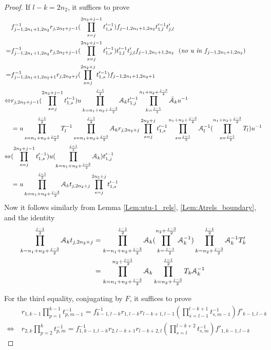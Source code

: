 \documentclass{amsart}
\begin{document}
\begin{proof}
If $l-k=2n_2$, it suffices to prove
\[
\begin{aligned}
&f^{-1}_{j-1,2n_1+1,2n_2}r_{j,2n_2+j-1}(\prod^{2n_2+j-1}_{s=j} t'^{-1}_{1,s})f_{j-1,2n_1+1,2n_2}t'^{-1}_{1,l}
t'_{j,l}\\
=&f^{-1}_{j-1,2n_1+1,2n_2}r_{j,2n_2+j-1}(\prod^{2n_2+j-1}_{s=j} t'^{-1}_{1,s})t'^{-1}_{1,l}
t'_{j,l}f_{j-1,2n_1+1,2n_2}\ \ (\textit{no u in }f_{j-1,2n_1+1,2n_2})\\
=&f^{-1}_{j-1,2n_1+1,2n_2+1}r_{j,2n_2+j}(\prod^{2n_2+j}_{s=j} t'^{-1}_{1,s})f_{j-1,2n_1+1,2n_2+1}\\
\Leftrightarrow & r_{j,2n_2+j-1}(\prod^{2n_2+j-1}_{s=j} t'^{-1}_{1,s})u\prod^{\frac{j-1}{2}}_{k=n_1+n_2+\frac{j-3}{2}}\AA_{k}t'^{-1}_{1,j}\prod^{n_1+n_2+\frac{j-3}{2}}_{k=\frac{j-1}{2}}\bar{\AA}_{k}u^{-1}\\
&=u\prod^{\frac{j-1}{2}}_{s=n_1+n_2+\frac{j-3}{2}}T^{-1}_{l} \prod^{\frac{j-1}{2}}_{s=n_1+n_2+\frac{j-3}{2}}\AA_k r_{j,2n_2+j}\prod^{2n_2+j}_{s=j} t'^{-1}_{1,s}\prod^{n_1+n_2+\frac{j-3}{2}}_{s=\frac{j-1}{2}}\AA^{-1}_l(\prod^{n_1+n_2+\frac{j-3}{2}}_{s=\frac{j-1}{2}}T_{l} )u^{-1}\\
\Leftrightarrow & (\prod^{2n_2+j-1}_{s=j} t'^{-1}_{1,s})u(\prod^{\frac{j-1}{2}}_{k=n_1+n_2+\frac{j-3}{2}}\AA_{k})t'^{-1}_{1,j}\\
&=u\prod^{\frac{j-1}{2}}_{k=n_1+n_2+\frac{j-3}{2}}\AA_k t_{j,2n_2+j}\prod^{2n_2+j}_{s=j} t'^{-1}_{1,s}\\
\end{aligned}
\]
Now it follows similarly from Lemma \ref{Lem:utu-1_rels}, \ref{Lem:Atrels_boundary}, and the identity
\[
\begin{aligned}
\prod^{\frac{j-1}{2}}_{k=n_1+n_2+\frac{j-3}{2}}\AA_k t_{j,2n_2+j}&=\prod^{\frac{j-1}{2}}_{k=n_1+n_2+\frac{j-3}{2}}\AA_k(\prod^{n_2+\frac{j-3}{2}}_{k=\frac{j-1}{2}}\AA^{-1}_k)\prod^{\frac{j-1}{2}}_{k=n_2+\frac{j-3}{2}}\AA^{-1}_kT'_k\\
&=\prod^{n_2+\frac{j-1}{2}}_{k=n_1+n_2+\frac{j-3}{2}}\AA_{k}\prod^{\frac{j-1}{2}}_{k=n_2+\frac{j-3}{2}}T_k\AA^{-1}_{k}
\end{aligned}
\]

For the third equality, conjugating by $F$, it suffices to prove
\[
\begin{aligned}
&r_{1,k-1}\prod^{k-1}_{p=1}t^{-1}_{p,m-1}=f^{-1}_{k-1,l-k}r_{1,l-k}r_{l-k+1,l-1}(\prod^{l-k+1}_{s=l-1} t^{-1}_{s,m-1})f'_{k-1,l-k}\\
\Leftrightarrow \ & r_{2,k}\prod^{k}_{p=2}t^{-1}_{p,m}=f^{-1}_{1,k-1,l-k}r_{2,l-k+1}r_{l-k+2,l}(\prod^{l-k+2}_{s=l} t^{-1}_{s,m})f'_{1,k-1,l-k}
\end{aligned}
\]


\end{proof}
\end{document}
